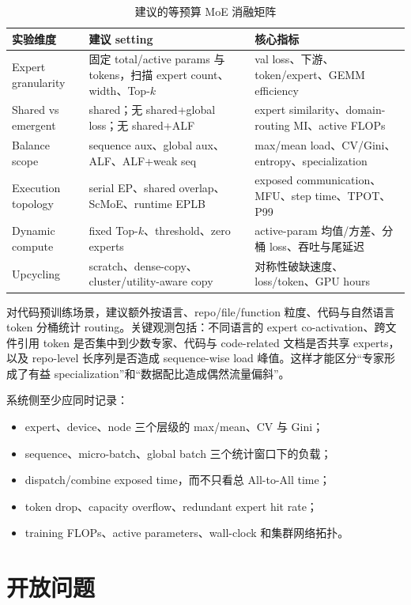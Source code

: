 \documentclass[10pt,a4paper,fontset=none]{ctexart}
\begin{document}
\begin{table}[htbp]
\centering
\caption{建议的等预算 MoE 消融矩阵}
\label{tab:experiments}
\small
\begin{tabularx}{\textwidth}{p{}p{}Y}
\toprule
实验维度 & 建议 setting & 核心指标 \\
\midrule
Expert granularity & 固定 total/active params 与 tokens，扫描 expert count、width、Top-$k$ & val loss、下游、token/expert、GEMM efficiency \\
Shared vs emergent & shared；无 shared+global loss；无 shared+ALF & expert similarity、domain-routing MI、active FLOPs \\
Balance scope & sequence aux、global aux、ALF、ALF+weak seq & max/mean load、CV/Gini、entropy、specialization \\
Execution topology & serial EP、shared overlap、ScMoE、runtime EPLB & exposed communication、MFU、step time、TPOT、P99 \\
Dynamic compute & fixed Top-$k$、threshold、zero experts & active-param 均值/方差、分桶 loss、吞吐与尾延迟 \\
Upcycling & scratch、dense-copy、cluster/utility-aware copy & 对称性破缺速度、loss/token、GPU hours \\
\bottomrule
\end{tabularx}
\end{table}

对代码预训练场景，建议额外按语言、repo/file/function 粒度、代码与自然语言 token 分桶统计 routing。关键观测包括：不同语言的 expert co-activation、跨文件引用 token 是否集中到少数专家、代码与 code-related 文档是否共享 experts，以及 repo-level 长序列是否造成 sequence-wise load 峰值。这样才能区分“专家形成了有益 specialization”和“数据配比造成偶然流量偏斜”。

系统侧至少应同时记录：
\begin{itemize}
  \item expert、device、node 三个层级的 max/mean、CV 与 Gini；
  \item sequence、micro-batch、global batch 三个统计窗口下的负载；
  \item dispatch/combine exposed time，而不只看总 All-to-All time；
  \item token drop、capacity overflow、redundant expert hit rate；
  \item training FLOPs、active parameters、wall-clock 和集群网络拓扑。
\end{itemize}

\section{开放问题}
\end{document}
